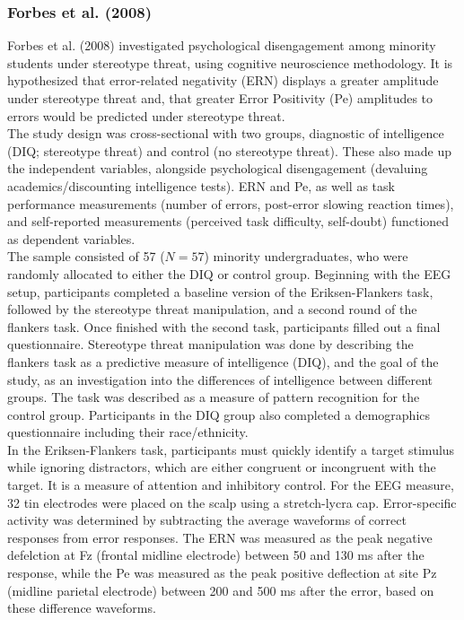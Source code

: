 \documentclass[
  stu,floatsintext]{apa7}
\begin{document}
\subsubsection{Forbes et al. (2008)}\label{forbesroledevaluingdiscounting2008}

Forbes et al. (2008) investigated psychological disengagement among minority students under stereotype threat, using cognitive neuroscience methodology.
It is hypothesized that error-related negativity (ERN) displays a greater amplitude under stereotype threat and, that greater Error Positivity (Pe) amplitudes to errors would be predicted under stereotype threat.\\
The study design was cross-sectional with two groups, diagnostic of intelligence (DIQ; stereotype threat) and control (no stereotype threat).
These also made up the independent variables, alongside psychological disengagement (devaluing academics/discounting intelligence tests). ERN and Pe, as well as task performance measurements (number of errors, post-error slowing reaction times), and self-reported measurements (perceived task difficulty, self-doubt) functioned as dependent variables.\\
The sample consisted of 57 (\(N = 57\)) minority undergraduates, who were randomly allocated to either the DIQ or control group.
Beginning with the EEG setup, participants completed a baseline version of the Eriksen-Flankers task, followed by the stereotype threat manipulation, and a second round of the flankers task.
Once finished with the second task, participants filled out a final questionnaire.
Stereotype threat manipulation was done by describing the flankers task as a predictive measure of intelligence (DIQ), and the goal of the study, as an investigation into the differences of intelligence between different groups.
The task was described as a measure of pattern recognition for the control group.
Participants in the DIQ group also completed a demographics questionnaire including their race/ethnicity.\\
In the Eriksen-Flankers task, participants must quickly identify a target stimulus while ignoring distractors, which are either congruent or incongruent with the target.
It is a measure of attention and inhibitory control.
For the EEG measure, 32 tin electrodes were placed on the scalp using a stretch-lycra cap.
Error-specific activity was determined by subtracting the average waveforms of correct responses from error responses.
The ERN was measured as the peak negative defelction at Fz (frontal midline electrode) between 50 and 130 ms after the response, while the Pe was measured as the peak positive deflection at site Pz (midline parietal electrode) between 200 and 500 ms after the error, based on these difference waveforms.
\end{document}
